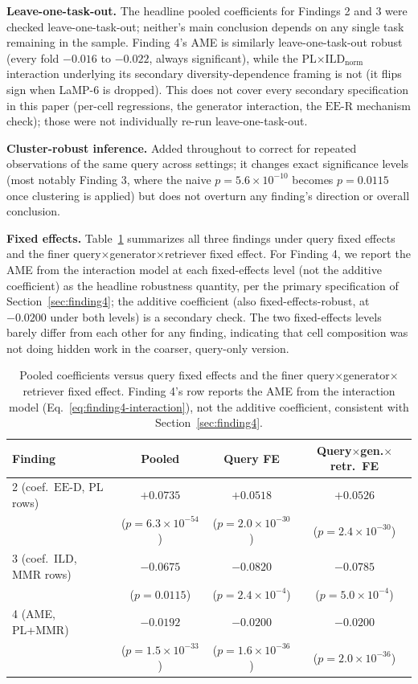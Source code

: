 \documentclass[11pt]{article}
\newcommand{\eed}{\ensuremath{\mathrm{EE\text{-}D}}}
\newcommand{\eer}{\ensuremath{\mathrm{EE\text{-}R}}}
\newcommand{\ild}{\ensuremath{\mathrm{ILD}}}
\newcommand{\ildnorm}{\ensuremath{\ild_{\mathrm{norm}}}}
\begin{document}
\textbf{Leave-one-task-out.} The headline pooled coefficients for
Findings 2 and 3 were checked leave-one-task-out; neither's main
conclusion depends on any single task remaining in the sample. Finding 4's
AME is similarly leave-one-task-out robust (every fold $-0.016$ to
$-0.022$, always significant), while the PL$\times$\ildnorm{} interaction
underlying its secondary diversity-dependence framing is not (it flips
sign when LaMP-6 is dropped). This does not cover every secondary
specification in this paper (per-cell regressions, the generator
interaction, the \eer{} mechanism check); those were not individually
re-run leave-one-task-out.

\textbf{Cluster-robust inference.} Added throughout to correct for
repeated observations of the same query across settings; it changes exact
significance levels (most notably Finding 3, where the naive
$p=5.6\times10^{-10}$ becomes $p=0.0115$ once clustering is applied) but
does not overturn any finding's direction or overall conclusion.

\textbf{Fixed effects.} Table~\ref{tab:fe-summary} summarizes all three
findings under query fixed effects and the finer
query$\times$generator$\times$retriever fixed effect. For Finding 4, we
report the AME from the interaction model at each fixed-effects level
(not the additive coefficient) as the headline robustness quantity, per
the primary specification of Section~\ref{sec:finding4}; the additive
coefficient (also fixed-effects-robust, at $-0.0200$ under both levels) is
a secondary check. The two fixed-effects levels barely differ from each
other for any finding, indicating that cell composition was not doing
hidden work in the coarser, query-only version.

\begin{table}[htbp]
\centering
\caption{Pooled coefficients versus query fixed effects and the finer
query$\times$generator$\times$retriever fixed effect. Finding 4's row
reports the AME from the interaction model (Eq.~\ref{eq:finding4-interaction}),
not the additive coefficient, consistent with Section~\ref{sec:finding4}.}
\label{tab:fe-summary}
\small
\begin{tabular}{lccc}
\toprule
Finding & Pooled & Query FE & Query$\times$gen.$\times$retr.\ FE \\
\midrule
2 (coef.\ \eed{}, PL rows) & $+0.0735$ & $+0.0518$ & $+0.0526$ \\
 & ($p=6.3\times10^{-54}$) & ($p=2.0\times10^{-30}$) & ($p=2.4\times10^{-30}$) \\
3 (coef.\ \ild{}, MMR rows) & $-0.0675$ & $-0.0820$ & $-0.0785$ \\
 & ($p=0.0115$) & ($p=2.4\times10^{-4}$) & ($p=5.0\times10^{-4}$) \\
4 (AME, PL+MMR) & $-0.0192$ & $-0.0200$ & $-0.0200$ \\
 & ($p=1.5\times10^{-33}$) & ($p=1.6\times10^{-36}$) & ($p=2.0\times10^{-36}$) \\
\bottomrule
\end{tabular}
\end{table}
\end{document}
